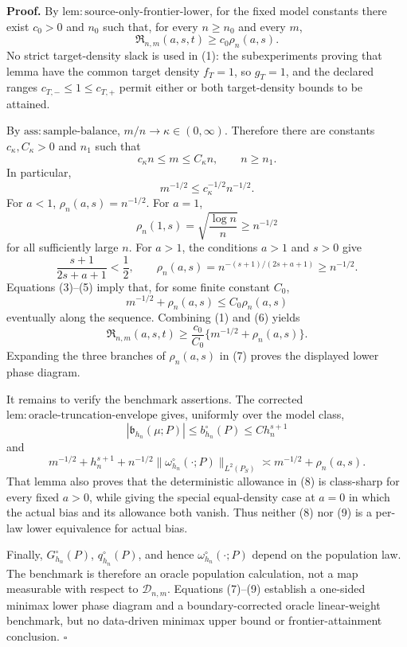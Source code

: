 \textbf{Proof.}
By \(\mathrm{lem:source\text{-}only\text{-}frontier\text{-}lower}\), for the fixed model constants there exist \(c_0>0\) and \(n_0\) such that, for every \(n\ge n_0\) and every \(m\),
\[
\mathfrak R_{n,m}(a,s,t)\ge c_0\rho_n(a,s).
\tag{1}
\]
No strict target-density slack is used in (1): the subexperiments proving that lemma have the common target density \(f_T=1\), so \(g_T=1\), and the declared ranges \(c_{T,-}\le1\le c_{T,+}\) permit either or both target-density bounds to be attained.

By \(\mathrm{ass:sample\text{-}balance}\), \(m/n\to\kappa\in(0,\infty)\). Therefore there are constants \(c_\kappa,C_\kappa>0\) and \(n_1\) such that
\[
c_\kappa n\le m\le C_\kappa n,
\qquad n\ge n_1.
\tag{2}
\]
In particular,
\[
m^{-1/2}\le c_\kappa^{-1/2}n^{-1/2}.
\tag{3}
\]
For \(a<1\), \(\rho_n(a,s)=n^{-1/2}\). For \(a=1\),
\[
\rho_n(1,s)=\sqrt{\frac{\log n}{n}}\ge n^{-1/2}
\tag{4}
\]
for all sufficiently large \(n\). For \(a>1\), the conditions \(a>1\) and \(s>0\) give
\[
\frac{s+1}{2s+a+1}<\frac12,
\qquad
\rho_n(a,s)=n^{-(s+1)/(2s+a+1)}\ge n^{-1/2}.
\tag{5}
\]
Equations (3)--(5) imply that, for some finite constant \(C_0\),
\[
m^{-1/2}+\rho_n(a,s)\le C_0\rho_n(a,s)
\tag{6}
\]
eventually along the sequence. Combining (1) and (6) yields
\[
\mathfrak R_{n,m}(a,s,t)
\ge \frac{c_0}{C_0}\{m^{-1/2}+\rho_n(a,s)\}.
\tag{7}
\]
Expanding the three branches of \(\rho_n(a,s)\) in (7) proves the displayed lower phase diagram.

It remains to verify the benchmark assertions. The corrected
\(\mathrm{lem:oracle\text{-}truncation\text{-}envelope}\) gives, uniformly over the model class,
\[
|\mathfrak b_{h_n}(\mu;P)|\le b_{h_n}^{\circ}(P)\le C h_n^{s+1}
\tag{8}
\]
and
\[
m^{-1/2}+h_n^{s+1}
+n^{-1/2}\|\omega_{h_n}^{\circ}(\cdot;P)\|_{L^2(P_S)}
\asymp m^{-1/2}+\rho_n(a,s).
\tag{9}
\]
That lemma also proves that the deterministic allowance in (8) is class-sharp for every fixed \(a>0\), while giving the special equal-density case at \(a=0\) in which the actual bias and its allowance both vanish. Thus neither (8) nor (9) is a per-law lower equivalence for actual bias.

Finally, \(G_{h_n}^{\circ}(P)\), \(q_{h_n}^{\circ}(P)\), and hence \(\omega_{h_n}^{\circ}(\cdot;P)\) depend on the population law. The benchmark is therefore an oracle population calculation, not a map measurable with respect to \(\mathcal D_{n,m}\). Equations (7)--(9) establish a one-sided minimax lower phase diagram and a boundary-corrected oracle linear-weight benchmark, but no data-driven minimax upper bound or frontier-attainment conclusion. \(\square\)